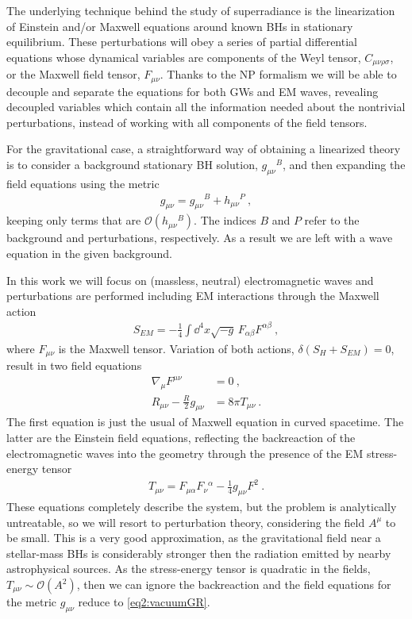The underlying technique behind the study of superradiance is the linearization of Einstein and/or Maxwell equations around known BHs in stationary equilibrium.
These perturbations will obey a series of partial differential equations whose dynamical variables are components of the Weyl tensor, $C_{\mu\nu\rho\sigma}$, or the Maxwell field tensor, $F_{\mu\nu}$.
Thanks to the NP formalism we will be able to decouple and separate the equations for both GWs and EM waves, revealing decoupled variables which contain all the information needed about the nontrivial perturbations, instead of working with all components of the field tensors.

For the gravitational case, a straightforward way of obtaining a linearized theory is to consider a background stationary BH solution, $g_{\mu\nu}{}^B$, and then expanding the field equations  using the metric 
\begin{align}
    g_{\mu\nu} = g_{\mu\nu}{}^B + h_{\mu\nu}{}^P ~,
    \label{eq2:metricBP}
\end{align}
keeping only terms that are $\mathscr{O}(h_{\mu\nu}{}^B)$. The indices $B$ and $P$ refer to the background and perturbations, respectively.
As a result we are left with a wave equation in the given background. 

In this work we will focus on (massless, neutral) electromagnetic waves and perturbations are performed including EM interactions through the Maxwell action
\begin{align}
    S_{EM} = - \frac{1}{4} \int \dd^4 x \sqrt{-g} \,F_{\alpha\beta} F^{\alpha\beta} ~,
     \label{eq2:actionEM}
\end{align}
where $F_{\mu\nu}$ is the Maxwell tensor.
Variation of both actions, $\delta(S_H + S_{EM}) = 0$, result in two field equations
\begin{align}
    \nabla_\mu F^{\mu\nu} &= 0 ~, \label{eq2:maxwellEM} \\
    R_{\mu\nu} - \frac{R}{2} g_{\mu\nu} &= 8 \pi T_{\mu\nu} \label{eq2:EM+GR}  ~.
\end{align}
The first equation is just the usual of Maxwell equation in curved spacetime.
The latter are the Einstein field equations, reflecting the backreaction of the electromagnetic waves into the geometry through the presence of the EM stress-energy tensor
\begin{align}
    T_{\mu\nu} = F_{\mu\alpha} F_{\nu}{}^{\alpha} - \frac{1}{4} g_{\mu\nu} F^2  ~.
    \label{eq2:stressenergyEM}
\end{align}
These equations completely describe the system, but the problem is analytically untreatable, so we will resort to perturbation theory, considering the field $A^\mu$ to be small. 
This is a very good approximation, as the gravitational field near a stellar-mass BHs is considerably stronger then the radiation emitted by nearby astrophysical sources.
As the stress-energy tensor is quadratic in the fields, $T_{\mu\nu}\sim\mathscr{O}(A^2)$, then we can ignore the backreaction and the field equations for the metric $g_{\mu\nu}$ reduce to \eqref{eq2:vacuumGR}.



